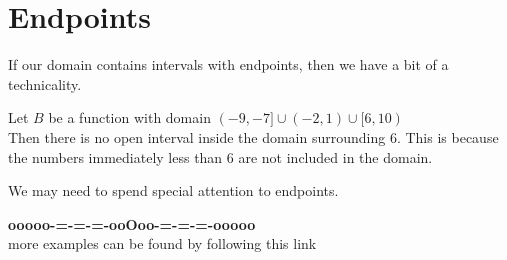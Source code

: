\documentclass{ximera}
\begin{document}
\section*{Endpoints}


If our domain contains intervals with endpoints, then we have a bit of a technicality.

Let $B$ be a function with domain $(-9, -7] \cup (-2, 1) \cup [6, 10)$ \\

Then there is no open interval inside the domain surrounding $6$.  This is because the numbers immediately less than $6$ are not included in the domain.


We may need to spend special attention to endpoints.












\begin{center}
\textbf{\textcolor{green!50!black}{ooooo-=-=-=-ooOoo-=-=-=-ooooo}} \\

more examples can be found by following this link\\ 

\end{center}
\end{document}
